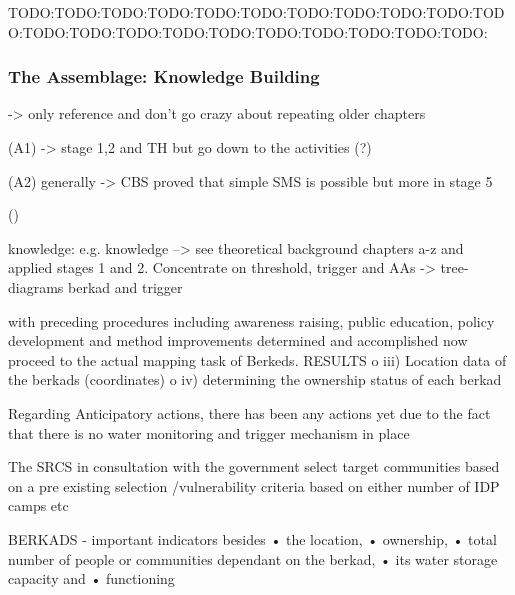 TODO:TODO:TODO:TODO:TODO:TODO:TODO:TODO:TODO:TODO:TODO:TODO:TODO:TODO:TODO:TODO:TODO:TODO:TODO:TODO:TODO:
\subsubsection{The Assemblage: Knowledge Building}
-> only reference and don't go crazy about repeating older chapters

(A1) -> stage 1,2 and TH
but go down to the activities (?)

(A2) generally -> CBS proved that simple SMS is possible but more in stage 5

()

knowledge:
e.g. knowledge --> see theoretical background chapters a-z and applied stages 1 and 2. Concentrate on threshold, trigger and AAs
-> tree-diagrams berkad and trigger



with preceding procedures including awareness raising, public education, policy development and method improvements determined and accomplished now proceed to the actual mapping task of Berkeds.
RESULTS
o	iii) Location data of the berkads (coordinates)
o	iv) determining the ownership status of each berkad





Regarding Anticipatory actions, there has been any actions yet due to the fact that there is no water monitoring and trigger mechanism in place %

The SRCS in consultation with the government select target communities based on a pre existing selection /vulnerability criteria based on either number of IDP camps etc

BERKADS - important indicators besides 
•	the location,
•	ownership,
•	total number of people or communities dependant on the berkad,
•	its water storage capacity and
•	functioning

